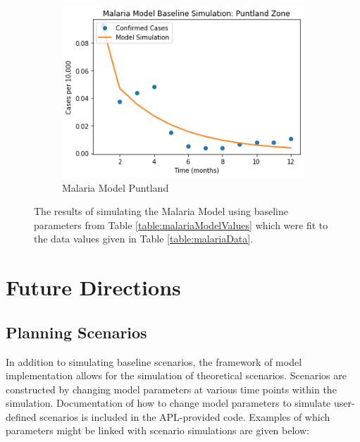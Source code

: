 \documentclass[letter,12pt, usenames,dvipsnames]{article}
\begin{document}
\begin{figure}[h!]
     \begin{subfigure}[b]{0.37\textwidth}
         \centering
         \includegraphics[width=\textwidth]{MalariaPuntland.png}
         \caption{Malaria Model Puntland}
     \end{subfigure}
        \caption{The results of simulating the Malaria Model using baseline parameters from Table \ref{table:malariaModelValues} which were fit to the data values given in Table \ref{table:malariaData}. }
        \label{fig:MalariaResults}
\end{figure}


\pagebreak

\section{Future Directions}


\subsection{Planning Scenarios}
In addition to simulating baseline scenarios, the framework of model implementation allows for the simulation of theoretical scenarios. Scenarios are constructed by changing model parameters at various time points within the simulation. Documentation of how to change model parameters to simulate user-defined scenarios is included in the APL-provided code. Examples of which parameters might be linked with scenario simulations are given below:
\end{document}
